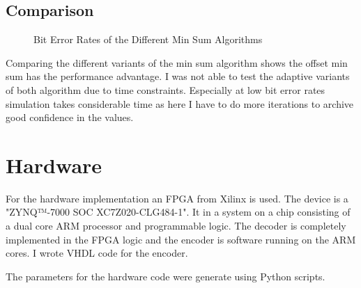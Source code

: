 \subsection{Comparison}
\begin{figure}
    \centering
    \label{min_sum_all_comp}
    \caption{Bit Error Rates of the Different Min Sum Algorithms}
\end{figure}
Comparing the different variants of the min sum algorithm shows the offset min sum has the performance advantage. I was not able to test the adaptive variants of both algorithm due to time constraints. Especially at low bit error rates simulation takes considerable time as here I have to do more iterations to archive good confidence in the values.

\section{Hardware}
For the hardware implementation an FPGA from Xilinx is used. The device is a "ZYNQ™-7000 SOC XC7Z020-CLG484-1". It in a system on a chip consisting of a dual core ARM processor and programmable logic. The decoder is completely implemented in the FPGA logic and the encoder is software running on the ARM cores. I wrote VHDL code for the encoder.

The parameters for the hardware code were generate using Python scripts.

